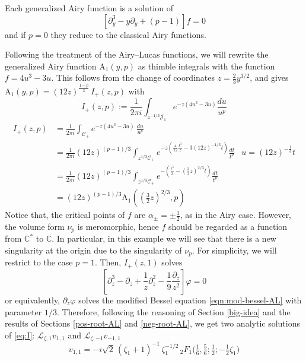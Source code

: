 \documentclass{article}
\newcommand{\C}{\mathbb{C}}
\newcommand{\laplace}{\mathcal{L}}
\theoremstyle{definition}
\theoremstyle{plain}
\newenvironment{verify}{\color{ForestGreen}}{\color{black}}
\begin{document}
Each generalized Airy function is a solution of
\begin{equation}
\left[\partial_y^3-y\partial_y+(p-1)\right]f=0
\end{equation} 
and if $p=0$ they reduce to the classical Airy functions.

Following the treatment of the Airy--Lucas functions, we will rewrite the generalized Airy function $\mathrm{A}_1(y,p)$ as thimble integrals with the function $f=4u^3-3u$. This follows from the change of coordinates $z=\tfrac{2}{3}y^{3/2}$, and gives $\mathrm{A}_1(y,p) = (12 z)^{\tfrac{1-p}{3}}\, I_+(z,p)$ with 
%
\[I_+(z,p):=\frac{1}{2\pi i}\int_{z^{-1/3}\mathcal{J}_1} e^{-z(4u^3-3u)} \frac{du}{u^p}\]
%
\begin{verify}
  \begin{align*}
I_{+}(z,p)&=\frac{1}{2\pi i}\int_{\mathcal{C}_{+}}e^{-z(4u^3-3u)}\, \frac{du}{u^p} &\\
&=\frac{1}{2\pi i}(12 z)^{(p-1)/3}\int_{z^{1/3}\mathcal{C}_{+}}e^{-z(\tfrac{4}{12}\tfrac{t^3}{z}-3 (12 z)^{-1/3}t)}\frac{dt}{t^p} & u=(12 z)^{-\tfrac{1}{3}}t\\
&=\frac{1}{2\pi i}(12 z)^{(p-1)/3}\int_{z^{1/3}\mathcal{C}_{+}}e^{-\left(\frac{t^3}{3}-(\tfrac{3}{2} z)^{2/3}t\right)}\frac{dt}{t^p} & \\
&=(12 z)^{(p-1)/3}\mathrm{A}_1((\tfrac{3}{2}z)^{2/3},p)
\end{align*}  
\end{verify}
%
Notice that, the critical points of $f$ are $\alpha_{\pm}=\pm\tfrac{1}{2}$, as in the Airy case. However, the volume form $\nu_p$ is meromorphic, hence $f$ should be regarded as a function from $\C^*$ to $\C$. In particular, in this example we will see that there is a new singularity at the origin due to the singularity of $\nu_p$. For simplicity, we will restrict to the case $p=1$. Then, $I_+(z,1)$ solves
\begin{equation}\label{eq:I}
\left[\partial_z^3-\partial_z+\frac{1}{z}\partial_z^2-\frac{1}{9}\frac{\partial_z}{z^2}\right]\varphi=0
\end{equation}
or equivalently, $\partial_z\varphi$ solves the modified Bessel equation \eqref{eqn:mod-bessel-AL} with parameter $1/3$. Therefore, following the reasoning of Section \ref{big-idea} and the results of Sections \ref{pos-root-AL} and \ref{neg-root-AL}, we get two analytic solutions of \eqref{eq:I}: $\laplace_{\zeta,1}v_{1,1}$ and $\laplace_{\zeta,-1}v_{-1,1}$ 
\[ v_{1,1}=-i\sqrt{2}\, (\zeta_1+1)^{-1}\, \zeta_1^{-1/2}\, {}_2F_1\Big(\tfrac{1}{6},\tfrac{5}{6};\tfrac{1}{2};-\tfrac{1}{2}\zeta_{1}\Big)\]
\end{document}
